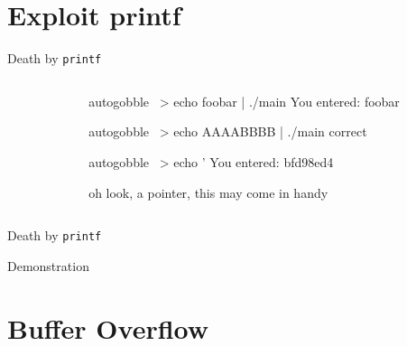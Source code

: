 \documentclass[beamer]{uibk}
\begin{document}
\section{Exploit printf}

\begin{frame}[fragile]{Death by \texttt{printf}}
    \begin{columns}
        \begin{column}{0.5\textwidth}
        \end{column}
        \begin{column}{0.5\textwidth}
            \pause
            \begin{pre*}{autogobble}
                ~> echo foobar | ./main
                You entered:
                foobar
            \end{pre*}
            \bigskip\pause
            \begin{pre*}{autogobble}
                ~> echo AAAABBBB | ./main
                correct
            \end{pre*}
            \bigskip\pause
            \begin{pre*} {autogobble}
                ~> echo '%
                You entered:
                bfd98ed4
            \end{pre*}
            \medskip
            oh look, a pointer, this may come in handy
        \end{column}
    \end{columns}
\end{frame}

\begin{frame}{Death by \texttt{printf}}
    \begin{center}
        \huge Demonstration
    \end{center}
\end{frame}

\section{Buffer Overflow}
\end{document}

